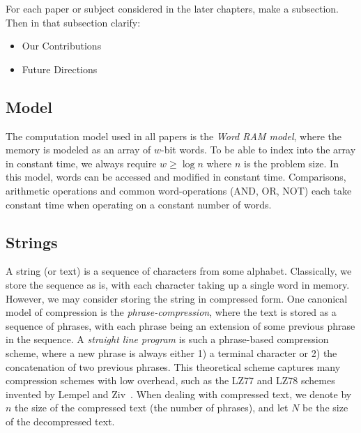 


\begin{framed}
\noindent For each paper or subject considered in the later chapters, make a subsection. 
Then in that subsection clarify:
\begin{itemize}
    \item Our Contributions
    \item Future Directions
\end{itemize}
\end{framed}

\subsection{Model}
The computation model used in all papers is the \emph{Word RAM model}, where the memory is modeled as an array of $w$-bit words. To be able to index into the array in constant time, we always require $w \geq \log n$ where $n$ is the problem size. In this model, words can be accessed and modified in constant time. Comparisons, arithmetic operations and common word-operations (AND, OR, NOT) each take constant time when operating on a constant number of words. 


\subsection{Strings}
A string (or text) is a sequence of characters from some alphabet. Classically, we store the sequence as is, with each character taking up a single word in memory. However, we may consider storing the string in compressed form.
One canonical model of compression is the \emph{phrase-compression}, where the text is stored as a sequence of phrases, with each phrase being an extension of some previous phrase in the sequence. A \emph{straight line program} is such a phrase-based compression scheme, where a new phrase is always either 1) a terminal character or 2) the concatenation of two previous phrases.
This theoretical scheme captures many compression schemes with low overhead, such as the LZ77 and LZ78 schemes invented by Lempel and Ziv~. 
When dealing with compressed text, we denote by $n$ the size of the compressed text (the number of phrases), and let $N$ be the size of the decompressed text. 

